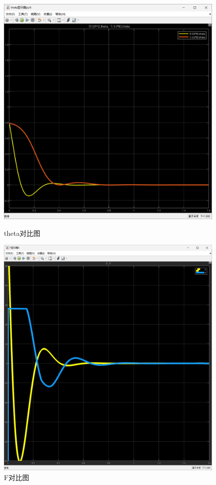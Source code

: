 \documentclass[12pt,a4paper,UTF8]{article}
\begin{document}
\begin{figure}[!htbp]
    \centering
    \begin{minipage}[b]{0.45\linewidth}
        \centering
        \includegraphics[width=0.9\linewidth]{figures/theta_output.png}
        \caption{theta对比图}
         
    \end{minipage}%
    \begin{minipage}[b]{0.45\linewidth}
        \centering
        \includegraphics[width=0.9\linewidth]{figures/F.png}
        \caption{F对比图}
    \end{minipage}
    

\end{figure}
\end{document}
